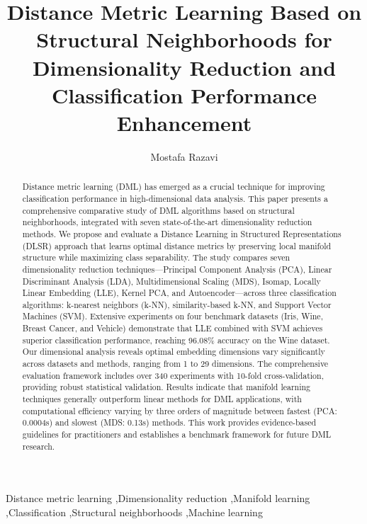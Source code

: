 \documentclass[review]{elsarticle}
\begin{document}
\begin{frontmatter}


\title{Distance Metric Learning Based on Structural Neighborhoods for Dimensionality Reduction and Classification Performance Enhancement}

\author[mymainaddress]{Mostafa Razavi}

\address[mymainaddress]{Department of Computer Science, University of Technology, City, Country}

\begin{abstract}
Distance metric learning (DML) has emerged as a crucial technique for improving classification performance in high-dimensional data analysis. This paper presents a comprehensive comparative study of DML algorithms based on structural neighborhoods, integrated with seven state-of-the-art dimensionality reduction methods. We propose and evaluate a Distance Learning in Structured Representations (DLSR) approach that learns optimal distance metrics by preserving local manifold structure while maximizing class separability. The study compares seven dimensionality reduction techniques—Principal Component Analysis (PCA), Linear Discriminant Analysis (LDA), Multidimensional Scaling (MDS), Isomap, Locally Linear Embedding (LLE), Kernel PCA, and Autoencoder—across three classification algorithms: k-nearest neighbors (k-NN), similarity-based k-NN, and Support Vector Machines (SVM). Extensive experiments on four benchmark datasets (Iris, Wine, Breast Cancer, and Vehicle) demonstrate that LLE combined with SVM achieves superior classification performance, reaching 96.08\% accuracy on the Wine dataset. Our dimensional analysis reveals optimal embedding dimensions vary significantly across datasets and methods, ranging from 1 to 29 dimensions. The comprehensive evaluation framework includes over 340 experiments with 10-fold cross-validation, providing robust statistical validation. Results indicate that manifold learning techniques generally outperform linear methods for DML applications, with computational efficiency varying by three orders of magnitude between fastest (PCA: 0.0004s) and slowest (MDS: 0.13s) methods. This work provides evidence-based guidelines for practitioners and establishes a benchmark framework for future DML research.

\end{abstract}

\begin{keyword}
Distance metric learning \sep Dimensionality reduction \sep Manifold learning \sep Classification \sep Structural neighborhoods \sep Machine learning
\end{keyword}

\end{frontmatter}
\end{document}
